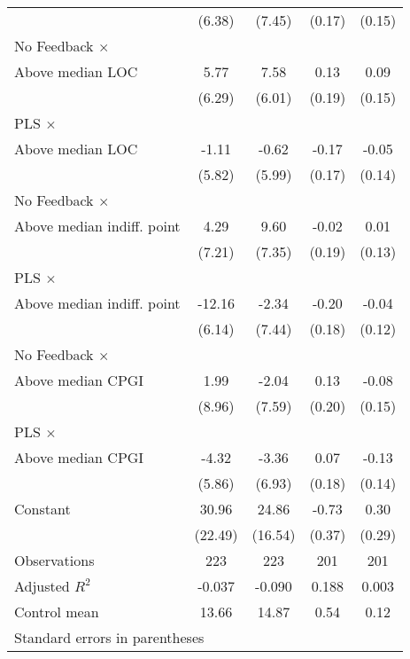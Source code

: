 \begin{table}[htbp]
\begin{tabular}{l*{4}{c}}
                &   (6.38)&   (7.45)&   (0.17)&   (0.15)\\
\addlinespace
No Feedback $\times$ \\ Above median LOC&     5.77&     7.58&     0.13&     0.09\\
                &   (6.29)&   (6.01)&   (0.19)&   (0.15)\\
\addlinespace
PLS $\times$ \\ Above median LOC&    -1.11&    -0.62&    -0.17&    -0.05\\
                &   (5.82)&   (5.99)&   (0.17)&   (0.14)\\
\addlinespace
No Feedback $\times$ \\ Above median indiff. point&     4.29&     9.60&    -0.02&     0.01\\
                &   (7.21)&   (7.35)&   (0.19)&   (0.13)\\
\addlinespace
PLS $\times$ \\ Above median indiff. point&   -12.16&    -2.34&    -0.20&    -0.04\\
                &   (6.14)&   (7.44)&   (0.18)&   (0.12)\\
\addlinespace
No Feedback $\times$ \\ Above median CPGI&     1.99&    -2.04&     0.13&    -0.08\\
                &   (8.96)&   (7.59)&   (0.20)&   (0.15)\\
\addlinespace
PLS $\times$ \\ Above median CPGI&    -4.32&    -3.36&     0.07&    -0.13\\
                &   (5.86)&   (6.93)&   (0.18)&   (0.14)\\
\addlinespace
Constant        &    30.96&    24.86&    -0.73&     0.30\\
                &  (22.49)&  (16.54)&   (0.37)&   (0.29)\\
\midrule
Observations    &      223&      223&      201&      201\\
Adjusted \(R^{2}\)&   -0.037&   -0.090&    0.188&    0.003\\
Control mean    &    13.66&    14.87&     0.54&     0.12\\
\bottomrule
\multicolumn{5}{l}{\footnotesize Standard errors in parentheses}\\
\end{tabular}
\end{table}

